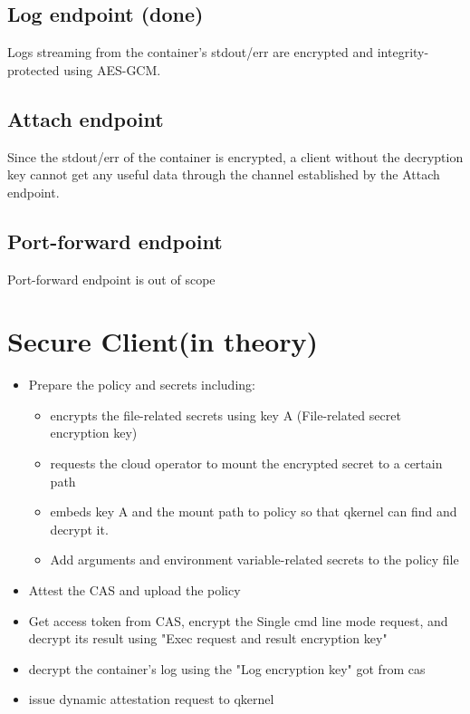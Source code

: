 \subsection{Log endpoint (done)}
Logs streaming from the container's stdout/err are encrypted and integrity-protected using AES-GCM.
\subsection{Attach endpoint}
Since the stdout/err of the container is encrypted, a client without the decryption key cannot get any useful data through the channel established by the Attach endpoint.

\subsection{Port-forward endpoint}
Port-forward endpoint is out of scope

\section{Secure Client(in theory)}

\begin{itemize}
    \item  Prepare the policy and secrets including:
    \begin{itemize}
        \item  encrypts the file-related secrets using key A (File-related secret encryption key)
        \item  requests the cloud operator to mount the encrypted secret to a certain path
        \item  embeds key A  and the mount path to policy so that qkernel can find and decrypt it.
        \item  Add arguments and environment variable-related secrets to the policy file
    \end{itemize}
    \item Attest the CAS and upload the policy
    \item  Get access token from CAS, encrypt the Single cmd line mode request, and decrypt its result using "Exec request and result encryption key"
    \item  decrypt the container's log using the "Log encryption key" got from cas
    \item  issue dynamic attestation request to qkernel
\end{itemize}



